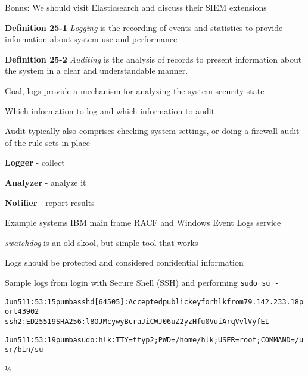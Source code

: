 \documentclass[Screen16to9,17pt]{foils}
\begin{document}
Bonus: We should visit Elasticsearch and discuss their SIEM extensions


\begin{list1}
\item {\bf Definition 25-1} \emph{Logging} is the recording of events and statistics to provide information about system use and performance
\item {\bf Definition 25-2} \emph{Auditing} is the analysis of records to present information about the system in a clear and understandable manner.
\item Goal, logs provide a mechanism for analyzing the system security state
\item Which information to log and which information to audit
\item Audit typically also comprises checking system settings, or doing a firewall audit of the rule sets in place
\end{list1}


\begin{list1}
\item {\bf Logger} - collect
\item {\bf Analyzer} - analyze it
\item {\bf Notifier} - report results
\item Example systems IBM main frame RACF and Windows Event Logs service
\item \emph{swatchdog} is an old skool, but simple tool that works
\item Logs should be protected and considered confidential information
\end{list1}

Sample logs from login with Secure Shell (SSH) and performing \verb+sudo su -+
\begin{alltt}\footnotesize
Jun  5 11:53:15 pumba sshd[64505]: Accepted publickey for hlk from 79.142.233.18 port 43902
 ssh2: ED25519 SHA256:l8OJMcywyBcraJiCWJ06uZ2yzHfu0VuiArqVvlVyfEI

Jun  5 11:53:19 pumba sudo:      hlk : TTY=ttyp2 ; PWD=/home/hlk ; USER=root ; COMMAND=/usr/bin/su -
\end{alltt}½


\end{document}
